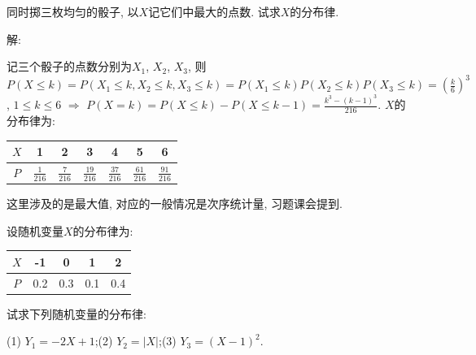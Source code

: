 \documentclass[standard]{ExBook}
\begin{document}
\begin{qitems}
\vspace{-5em}

    \begin{bbox}
    \begin{shaded}
        \qitem
同时掷三枚均匀的骰子, 以$X$记它们中最大的点数. 试求$X$的分布律.
    \end{shaded}
    \end{bbox}

\vspace{-5em}

    \begin{bbox}
解: 

记三个骰子的点数分别为$X_1$, $X_2$, $X_3$, 则$P(X\leq k)=P(X_1\leq k,X_2\leq k,X_3\leq k)=P(X_1\leq k)P(X_2\leq k)P(X_3\leq k)=\left(\frac{k}{6}\right)^3$, $1\leq k\leq 6$ $\Longrightarrow$ $P(X=k)=P(X\leq k)-P(X\leq k-1)=\frac{k^3-(k-1)^3}{216}$. $X$的分布律为:
\begin{center}
\setlength{\tabcolsep}{14pt}
\begin{tabular}{c|cccccc}
    \hline
    $X$ & 1 & 2 & 3 & 4 & 5 & 6 \\
    \hline
    $P$ & $\frac{1}{216}$ & $\frac{7}{216}$ & $\frac{19}{216}$ & $\frac{37}{216}$ & $\frac{61}{216}$ & $\frac{91}{216}$ \\
    \hline
\end{tabular}
\end{center}

\textcolor{themeColor}{\selectfont {} 这里涉及的是最大值, 对应的一般情况是次序统计量, 习题课会提到.}
    \end{bbox}

\vspace{-5em}

    \begin{bbox}
    \begin{shaded}
        \qitem
设随机变量$X$的分布律为:
\begin{center}
\setlength{\tabcolsep}{20pt}
\begin{tabular}{c|cccc}
$X$ & -1 & 0 & 1 & 2\\
\hline
$P$ & 0.2 & 0.3 & 0.1 & 0.4\\
\end{tabular}
\end{center}
试求下列随机变量的分布律: 

(1) $Y_{1}=-2X+1$;\qquad(2) $Y_{2}=|X|$;\qquad(3) $Y_{3}=(X-1)^2$.
    \end{shaded}
    \end{bbox}


\end{qitems}
\end{document}
